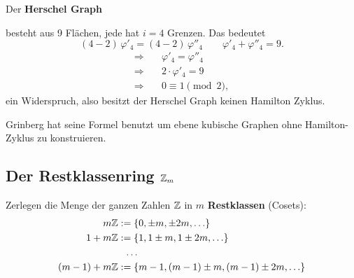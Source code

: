 \begin{beispiel}
Der \textbf{Herschel Graph}

besteht aus 9 Flächen, jede hat $i = 4$ Grenzen. Das bedeutet
\[ (4 - 2)\,\varphi'_4 = (4 - 2)\,\varphi''_4 \qquad \varphi'_4 + \varphi''_4 = 9. \]
\begin{align*}
\Rightarrow &\quad \varphi'_4 = \varphi''_4 \\
\Rightarrow &\quad 2 \cdot \varphi'_4 = 9 \\
\Rightarrow &\quad 0 \equiv 1 \pmod{2},
\end{align*}
ein Widerspruch, also besitzt der Herschel Graph keinen Hamilton Zyklus.
\end{beispiel}

Grinberg hat seine Formel benutzt um ebene kubische Graphen ohne Hamilton-Zyklus zu konstruieren.

\subsection{Der Restklassenring $\mathbb{Z}_{m}$}

Zerlegen die Menge der ganzen Zahlen $\mathbb{Z}$ in $m$ \textbf{Restklassen} (Cosets):
\begin{align*}
m\mathbb{Z} &:= \{ 0, \pm m, \pm 2m, \ldots \} \\
1 + m\mathbb{Z} &:= \{ 1, 1 \pm m, 1 \pm 2m, \ldots \} \\
&\ \ \ldots \\
(m-1) + m\mathbb{Z} &:= \{ m-1, (m-1) \pm m, (m-1) \pm 2m, \ldots \}
\end{align*}

